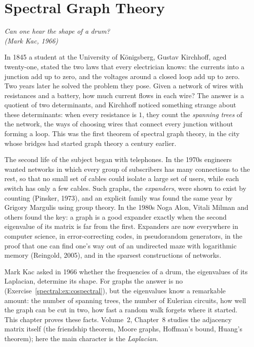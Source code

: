 \chapter{Spectral Graph Theory}

\begin{center}\itshape
Can one hear the shape of a drum?\\
\upshape(Mark Kac, 1966)
\end{center}

In 1845 a student at the University of K\"onigsberg, Gustav Kirchhoff, aged twenty-one, stated the two laws that every
electrician knows: the currents into a junction add up to zero, and the voltages around a closed loop add up to zero. Two
years later he solved the problem they pose. Given a network of wires with resistances and a battery, how much current
flows in each wire? The answer is a quotient of two determinants, and Kirchhoff noticed something strange about these
determinants: when every resistance is $1$, they count the \emph{spanning trees} of the network, the ways of choosing
wires that connect every junction without forming a loop. This was the first theorem of spectral graph theory, in the city
whose bridges had started graph theory a century earlier.

The second life of the subject began with telephones. In the 1970s engineers wanted networks in which every group of
subscribers has many connections to the rest, so that no small set of cables could isolate a large set of users, while
each switch has only a few cables. Such graphs, the \emph{expanders}, were shown to exist by counting (Pinsker, 1973), and an
explicit family was found the same year by Grigory Margulis using group theory. In the 1980s Noga Alon, Vitali Milman and
others found the key: a graph is a good expander exactly when the second eigenvalue of its matrix is far from the first.
Expanders are now everywhere in computer science, in error-correcting codes, in pseudorandom generators, in the
proof that one can find one's way out of an undirected maze with logarithmic memory (Reingold, 2005), and in the
sparsest constructions of networks.

Mark Kac asked in 1966 whether the frequencies of a drum, the eigenvalues of its Laplacian, determine its shape. For
graphs the answer is no (Exercise~\ref{spectral:ex:cospectral}), but the eigenvalues know a remarkable amount: the number of spanning
trees, the number of Eulerian circuits, how well the graph can be cut in two, how fast a random walk forgets where it started.
This chapter proves these facts. Volume~2, Chapter~8 studies the adjacency matrix itself (the friendship theorem, Moore graphs,
Hoffman's bound, Huang's theorem); here the main character is the \emph{Laplacian}.

